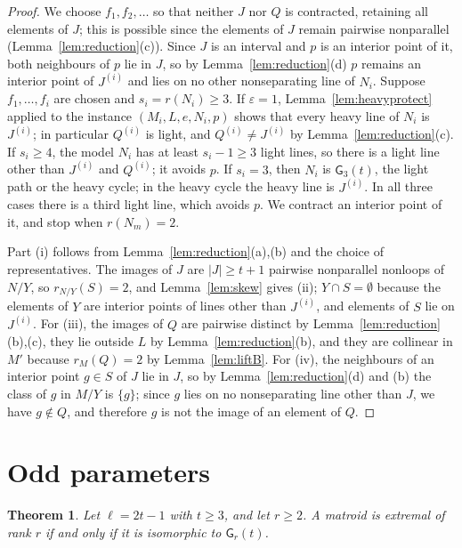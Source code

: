 \documentclass[11pt]{amsart}
\newtheorem{theorem}{Theorem}[section]
\theoremstyle{definition}
\theoremstyle{remark}
\numberwithin{equation}{section}
\newcommand{\GW}{\mathsf{G}}
\begin{document}
\begin{proof}
We choose $f_1,f_2,\dots$ so that neither $J$ nor $Q$ is contracted, retaining all elements of $J$; this is possible since the elements of $J$ remain pairwise nonparallel (Lemma~\ref{lem:reduction}(c)). Since $J$ is an interval and $p$ is an interior point of it, both neighbours of $p$ lie in $J$, so by Lemma~\ref{lem:reduction}(d) $p$ remains an interior point of $J^{(i)}$ and lies on no other nonseparating line of $N_i$. Suppose $f_1,\dots,f_i$ are chosen and $s_i=r(N_i)\ge3$. If $\varepsilon=1$, Lemma~\ref{lem:heavyprotect} applied to the instance $(M_i,L,e,N_i,p)$ shows that every heavy line of $N_i$ is $J^{(i)}$; in particular $Q^{(i)}$ is light, and $Q^{(i)}\ne J^{(i)}$ by Lemma~\ref{lem:reduction}(c). If $s_i\ge4$, the model $N_i$ has at least $s_i-1\ge3$ light lines, so there is a light line other than $J^{(i)}$ and $Q^{(i)}$; it avoids $p$. If $s_i=3$, then $N_i$ is $\GW_3(t)$, the light path or the heavy cycle; in the heavy cycle the heavy line is $J^{(i)}$. In all three cases there is a third light line, which avoids $p$. We contract an interior point of it, and stop when $r(N_m)=2$.

Part (i) follows from Lemma~\ref{lem:reduction}(a),(b) and the choice of representatives. The images of $J$ are $|J|\ge t+1$ pairwise nonparallel nonloops of $N/Y$, so $r_{N/Y}(S)=2$, and Lemma~\ref{lem:skew} gives (ii); $Y\cap S=\emptyset$ because the elements of $Y$ are interior points of lines other than $J^{(i)}$, and elements of $S$ lie on $J^{(i)}$. For (iii), the images of $Q$ are pairwise distinct by Lemma~\ref{lem:reduction}(b),(c), they lie outside $L$ by Lemma~\ref{lem:reduction}(b), and they are collinear in $M'$ because $r_M(Q)=2$ by Lemma~\ref{lem:liftB}. For (iv), the neighbours of an interior point $g\in S$ of $J$ lie in $J$, so by Lemma~\ref{lem:reduction}(d) and (b) the class of $g$ in $M/Y$ is $\{g\}$; since $g$ lies on no nonseparating line other than $J$, we have $g\notin Q$, and therefore $g$ is not the image of an element of $Q$.
\end{proof}

\section{Odd parameters}\label{sec:odd}

\begin{theorem}\label{thm:odd}
Let $\ell=2t-1$ with $t\ge3$, and let $r\ge2$. A matroid is extremal of rank $r$ if and only if it is isomorphic to $\GW_r(t)$.
\end{theorem}
\end{document}
